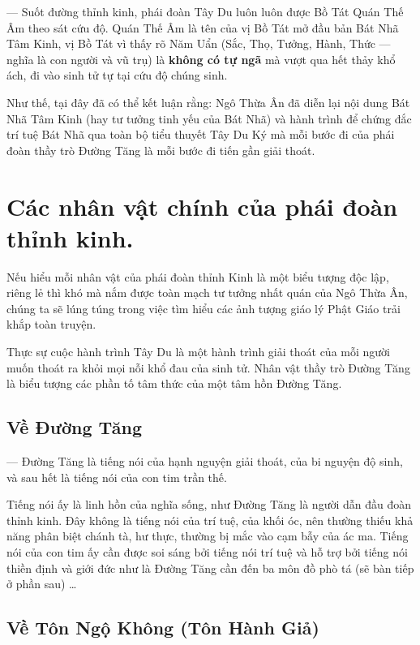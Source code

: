 — Suốt đường thỉnh kinh, phái đoàn Tây Du luôn luôn được Bồ Tát Quán Thế Âm theo sát cứu độ. Quán Thế Âm là tên của vị Bồ Tát mở đầu bản Bát Nhã Tâm Kinh, vị Bồ Tát vì thấy rõ Năm Uẩn (Sắc, Thọ, Tưởng, Hành, Thức — nghĩa là con người và vũ trụ) là {\bf không có tự ngã} mà vượt qua hết thảy khổ ách, đi vào sinh tử tự tại cứu độ chúng sinh.

Như thế, tại đây đã có thể kết luận rằng: Ngô Thừa Ân đã diễn lại nội dung Bát Nhã Tâm Kinh (hay tư tưởng tinh yếu của Bát Nhã) và hành trình để chứng đắc trí tuệ Bát Nhã qua toàn bộ tiểu thuyết Tây Du Ký mà mỗi bước đi của phái đoàn thầy trò Đường Tăng là mỗi bước đi tiến gần giải thoát.

\section{Các nhân vật chính của phái đoàn thỉnh kinh.} %
\label{sec:cac_nhan_vat_chinh_cua_phai_doan_thinh_kinh}

Nếu hiểu mỗi nhân vật của phái đoàn thỉnh Kinh là một biểu tượng độc lập, riêng lẻ thì khó mà nắm được toàn mạch tư tưởng nhất quán của Ngô Thừa Ân, chúng ta sẽ lúng túng trong việc tìm hiểu các ảnh tượng giáo lý Phật Giáo trải khắp toàn truyện.

Thực sự cuộc hành trình Tây Du là một hành trình giải thoát của mỗi người muốn thoát ra khỏi mọi nỗi khổ đau của sinh tử. Nhân vật thầy trò Đường Tăng là biểu tượng các phần tố tâm thức của một tâm hồn Đường Tăng.

\subsection{Về Đường Tăng} %
\label{sub:ve_duong_tang}


—  Đường Tăng là tiếng nói của hạnh nguyện giải thoát, của bi nguyện độ sinh, và sau hết là tiếng nói của con tim trần thế.

Tiếng nói ấy là linh hồn của nghĩa sống, như Đường Tăng là người dẫn đầu đoàn thỉnh kinh. Đây không là tiếng nói của trí tuệ, của khối óc, nên thường thiếu khả năng phân biệt chánh tà, hư thực, thường bị mắc vào cạm bẫy của ác ma. Tiếng nói của con tim ấy cần được soi sáng bởi tiếng nói trí tuệ và hỗ trợ bởi tiếng nói thiền định và giới đức như là Đường Tăng cần đến ba môn đồ phò tá (sẽ bàn tiếp ở phần sau) \ldots

\subsection{Về Tôn Ngộ Không (Tôn Hành Giả)} %
\label{sub:ve_ton_ngo_khong}

